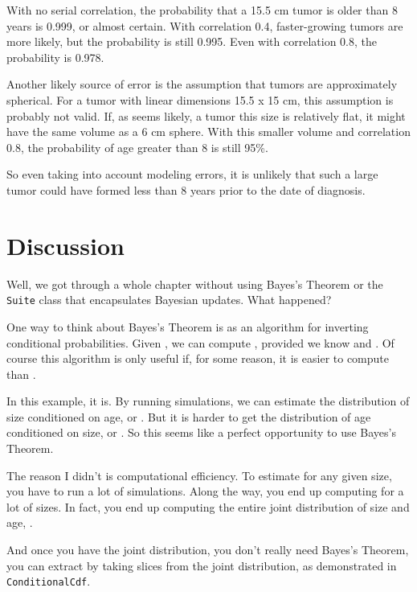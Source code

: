 \documentclass[12pt]{book}
\begin{document}
With no serial correlation, the probability that a
15.5 cm tumor is older than 8 years is 0.999, or almost certain.
With correlation 0.4, faster-growing tumors are more likely, but
the probability is still 0.995.  Even with correlation 0.8, the
probability is 0.978.

Another likely source of error is the assumption that tumors are
approximately spherical.  For a tumor with linear dimensions 15.5 x 15
cm, this assumption is probably not valid.  If, as seems likely, a
tumor this size
is relatively flat, it might have the same volume as a 6 cm sphere.
With this smaller volume and correlation 0.8, the probability of age
greater than 8 is still 95\%.

So even taking into account modeling errors, it is unlikely that such
a large tumor could have formed less than 8 years prior to the date of
diagnosis.


\section{Discussion}

Well, we got through a whole chapter without using Bayes's Theorem or
the {\tt Suite} class that encapsulates Bayesian updates.  What
happened?

One way to think about Bayes's Theorem is as an algorithm for
inverting conditional probabilities.  Given , we can compute
, provided we know  and .  Of course this algorithm
is only useful if, for some reason, it is easier to compute 
than .

In this example, it is.  By running simulations, we can estimate the
distribution of size conditioned on age, or .  But it is
harder to get the distribution of age conditioned on size, or
.  So this seems like a perfect opportunity to use Bayes's
Theorem.

The reason I didn't is computational efficiency.  To estimate
 for any given size, you have to run a lot of simulations.
Along the way, you end up computing  for a lot of sizes.
In fact, you end up computing the entire joint distribution of size
and age, .

And once you have the joint distribution, you don't really need
Bayes's Theorem, you can extract  by taking slices from
the joint distribution, as demonstrated in {\tt ConditionalCdf}.
\end{document}
